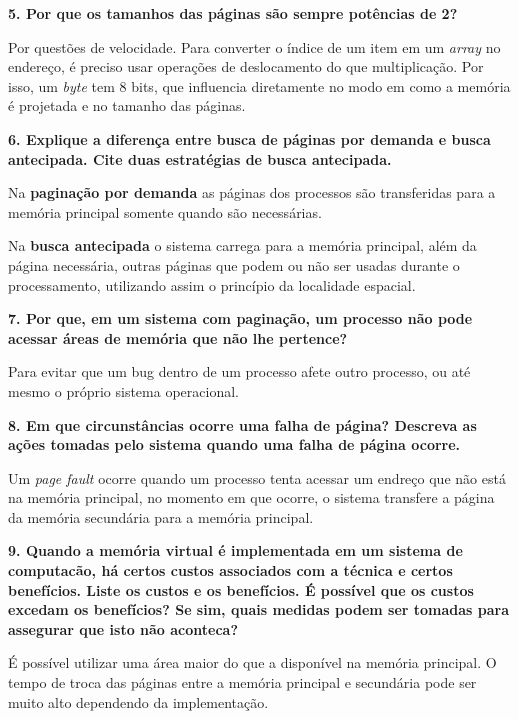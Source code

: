 \documentclass[12pt,a4paper]{article}
\newcommand{\pergunta}[1]{\noindent \textbf{#1}}
\begin{document}
\pergunta{5. Por que os tamanhos das páginas são sempre potências de 2?}

Por questões de velocidade.  Para converter o índice de um item em um
\textsl{array} no endereço, é preciso usar operações de 
deslocamento do que multiplicação.  Por isso, um \textsl{byte} tem 8 bits,
que influencia diretamente no modo em como a memória é projetada e no
tamanho das páginas.

\pergunta {6. Explique a diferença entre busca de páginas por demanda e busca 
antecipada. Cite duas estratégias de busca antecipada.}

Na \textbf{paginação por demanda} as páginas dos processos são transferidas para
a memória principal somente	quando são necessárias.

Na \textbf{busca antecipada} o sistema carrega para a memória principal, além
da página necessária, outras páginas que podem ou não ser usadas durante o 
processamento, utilizando assim o princípio da localidade espacial.

\pergunta {7. Por que, em um sistema com paginação, um processo não pode acessar
 áreas de memória que não lhe pertence?}

Para evitar que um bug dentro de um processo afete outro processo, ou até mesmo
o próprio sistema operacional.

\pergunta{8. Em que circunstâncias ocorre uma falha de página? Descreva as ações
tomadas pelo sistema quando uma falha de página ocorre.}

Um \textsl{page fault} ocorre quando um processo tenta acessar um endreço que 
não está na memória principal, no momento em que ocorre, o sistema transfere a 
página da memória secundária para a memória principal.

\pergunta{9. Quando a memória virtual é implementada em um sistema de 
computacão, há
certos custos associados com a técnica e certos benefícios. Liste os custos e os
benefícios. É possível que os custos excedam os benefícios? Se sim, quais
medidas podem ser tomadas para assegurar que isto não aconteca?}

É possível utilizar uma área maior do que a disponível na memória principal.
O tempo de troca das páginas entre a memória principal e secundária pode ser
muito alto dependendo da implementação.
\end{document}

